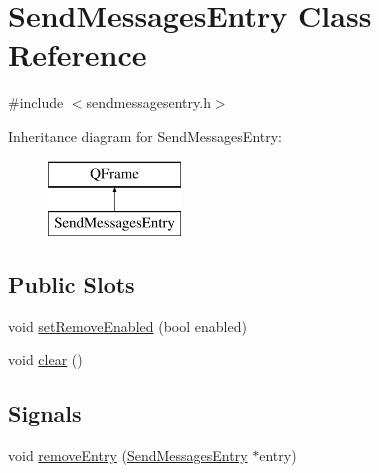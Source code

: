 \hypertarget{class_send_messages_entry}{}\section{Send\+Messages\+Entry Class Reference}
\label{class_send_messages_entry}


{\ttfamily \#include $<$sendmessagesentry.\+h$>$}

Inheritance diagram for Send\+Messages\+Entry\+:\begin{figure}[H]
\begin{center}
\leavevmode
\includegraphics[height=2.000000cm]{class_send_messages_entry}
\end{center}
\end{figure}
\subsection*{Public Slots}
\begin{DoxyCompactItemize}
\item 
void \hyperlink{class_send_messages_entry_a423c43c6473c007bb8caebd724391949}{set\+Remove\+Enabled} (bool enabled)
\item 
void \hyperlink{class_send_messages_entry_a98871865c8a13f83c15b9107ea65d249}{clear} ()
\end{DoxyCompactItemize}
\subsection*{Signals}
\begin{DoxyCompactItemize}
\item 
void \hyperlink{class_send_messages_entry_a878874b6e07b775060a8e4918c1d9952}{remove\+Entry} (\hyperlink{class_send_messages_entry}{Send\+Messages\+Entry} $\ast$entry)
\end{DoxyCompactItemize}
